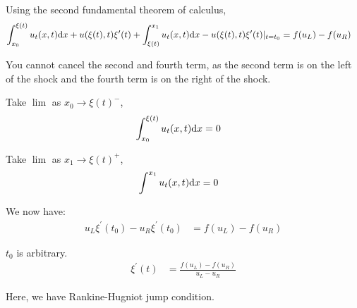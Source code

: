   Using the second fundamental theorem of calculus,
  \begin{align}
    \int^{\xi(t)}_{x_0} u_t(x, t) \text dx + u(\xi(t), t) \xi^\prime(t) + \int^{x_1}_{\xi(t)} u_t(x, t) \text dx - u(\xi(t), t)\xi^\prime(t)|_{t = t_0} & = f(u_L) - f(u_R)
  \end{align}

  You cannot cancel the second and fourth term, as the second term is on the left of the shock and the fourth term is on the right of the shock.

  Take $\lim$ as $x_0 \to \xi(t)^-$,
  \begin{align}
    \int^{\xi(t)}_{x_0} u_t(x, t) \text dx & = 0
  \end{align}

  Take $\lim$ as $x_1 \to \xi(t)^+$,
  \begin{align}
    \int^{x_1} u_t(x, t) \text dx & = 0
  \end{align}

  We now have:
  \begin{align}
    u_L \xi^\prime(t_0) - u_R \xi^\prime(t_0) & = f(u_L) - f(u_R)
  \end{align}

  $t_0$ is arbitrary.
  \begin{align}
    \xi^\prime(t) & = \frac{f(u_L) - f(u_R)}{u_L - u_R}
  \end{align}

  Here, we have Rankine-Hugniot jump condition.


